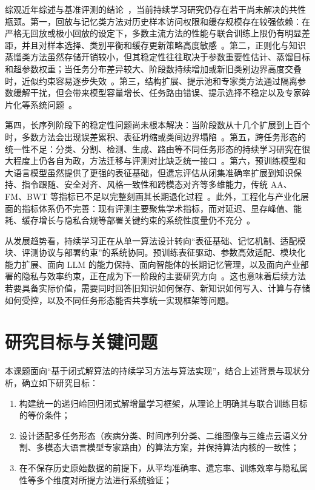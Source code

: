综观近年综述与基准评测的结论~\citep{wang2024survey,zhou2023cil_survey_zh,leo2024survey,qiao2024tscil}，当前持续学习研究仍存在若干尚未解决的共性瓶颈。第一，回放与记忆类方法对历史样本访问权限和缓存规模存在较强依赖：在严格无回放或极小回放的设定下，多数主流方法的性能与联合训练上限仍有明显差距，并且对样本选择、类别平衡和缓存更新策略高度敏感~\citep{aljundi2019gradient,chaudhry2019continual,chaudhry2021using,ASER}。第二，正则化与知识蒸馏类方法虽然存储开销较小，但其稳定性往往取决于参数重要性估计、蒸馏目标和超参数权重；当任务分布差异较大、阶段数持续增加或新旧类别边界高度交叠时，近似约束容易逐步失效~\citep{kirkpatrick2017ewc,li2017learning,Douillard_Cord_Ollion_Robert_Valle_2020}。第三，结构扩展、提示池和专家类方法通过隔离参数缓解干扰，但会带来模型容量增长、任务路由错误、提示选择不稳定以及专家碎片化等系统问题~\citep{rusu2016progressive,wang2022dualprompt,smith2023coda,chen2024coin}。

第四，长序列阶段下的稳定性问题尚未根本解决：当阶段数从十几个扩展到上百个时，多数方法会出现误差累积、表征坍缩或类间边界塌陷~\citep{cao2024continual,chen2025class,chen2025sefe}。第五，跨任务形态的统一性不足：分类、分割、检测、生成、路由等不同任务形态的持续学习研究在很大程度上仍各自为政，方法迁移与评测对比缺乏统一接口~\citep{wang2024survey,leo2024survey}。第六，预训练模型和大语言模型虽然提供了更强的表征基础，但遗忘评估从闭集准确率扩展到知识保持、指令跟随、安全对齐、风格一致性和跨模态对齐等多维能力，传统 AA、FM、BWT 等指标已不足以完整刻画其长期退化过程~\citep{wang2025llm_cl_zh,shi2024llmcontinual,wang2024trace}。此外，工程化与产业化层面的指标体系仍不完善：现有评测主要聚焦学术指标，而对延迟、显存峰值、能耗、缓存增长与隐私合规等部署关键约束的系统性度量仍不充分~\citep{de2021continual,yang2023medmnist,derakhshani2022lifelonger}。

从发展趋势看，持续学习正在从单一算法设计转向“表征基础、记忆机制、适配模块、评测协议与部署约束”的系统协同。预训练表征驱动、参数高效适配、模块化能力扩展、面向 LLM 的能力保持、面向智能体的长期记忆管理，以及面向产业部署的隐私与效率约束，正在成为下一阶段的主要研究方向~\citep{wang2025llm_cl_zh,cossu2024continual,zhou2024class,packer2023memgpt}。这也意味着后续方法若要具备实际价值，需要同时回答旧知识如何保存、新知识如何写入、计算与存储如何受控，以及不同任务形态能否共享统一实现框架等问题。

\section{研究目标与关键问题}

本课题面向“基于闭式解算法的持续学习方法与算法实现”，结合上述背景与现状分析，确立如下研究目标：
\begin{enumerate}
    \item 构建统一的递归岭回归闭式解增量学习框架，从理论上明确其与联合训练目标的等价条件；
    \item 设计适配多任务形态（疾病分类、时间序列分类、二维图像与三维点云语义分割、多模态大语言模型专家路由）的算法方案，并保持算法内核的一致性；
    \item 在不保存历史原始数据的前提下，从平均准确率、遗忘率、训练效率与隐私属性等多个维度对所提方法进行系统验证；
\end{enumerate}

